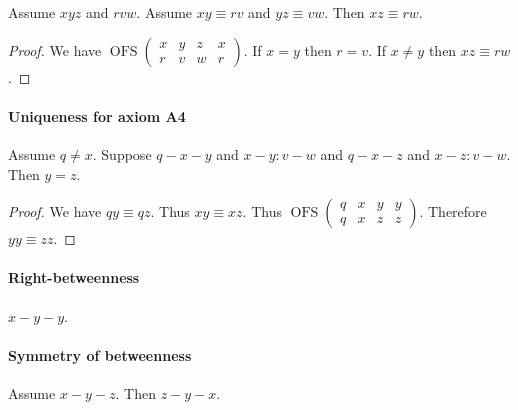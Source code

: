\documentclass{article}
\newcommand{\Cong}[4]{#1 #2 \equiv #3 #4}
\newcommand{\Betw}[3]{#1 #2 #3}
\newcommand{\OFS}[8]{\operatorname{OFS}
\left(\begin{smallmatrix}%
#1 & #2 & #3 & #4 \\
#5 & #6 & #7 & #8
\end{smallmatrix}\right)%
}
\begin{document}
  \begin{forthel}
    \begin{lemma} %
      Assume $\Betw{x}{y}{z}$ and $\Betw{r}{v}{w}$.
      Assume $\Cong{x}{y}{r}{v}$ and $\Cong{y}{z}{v}{w}$.
      Then $\Cong{x}{z}{r}{w}$.
    \end{lemma}
    \begin{proof}
      We have $\OFS{x}{y}{z}{x}{r}{v}{w}{r}$. %
      If $x = y$ then $r = v$.                %
      If $x \neq y$ then $\Cong{x}{z}{r}{w}$. %
    \end{proof}
  \end{forthel}


  \paragraph{Uniqueness for axiom A4}

  \begin{forthel}
    \begin{lemma} %
      Assume $q \neq x$.
      Suppose $q-x-y$ and $x-y : v-w$ and $q-x-z$ and $x-z : v-w$.
      Then $y = z$.
    \end{lemma}
    \begin{proof}
      We have $\Cong{q}{y}{q}{z}$.
      Thus $\Cong{x}{y}{x}{z}$.
      Thus $\OFS{q}{x}{y}{y}{q}{x}{z}{z}$.
      Therefore $\Cong{y}{y}{z}{z}$.
    \end{proof}
  \end{forthel}


  \paragraph{Right-betweenness}

  \begin{forthel}
    \begin{lemma} %
      $x-y-y$.
    \end{lemma}
  \end{forthel}


  \paragraph{Symmetry of betweenness}

  \begin{forthel}
    \begin{lemma}[SymmetryBetweenness] %
      Assume $x-y-z$. Then $z-y-x$.
    \end{lemma}
  \end{forthel}
\end{document}
